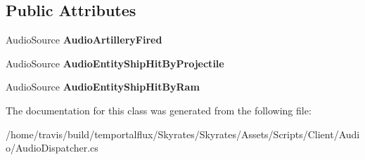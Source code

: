 \subsection*{Public Attributes}
\begin{DoxyCompactItemize}
\item 
\hypertarget{class_skyrates_1_1_client_1_1_audio_dispatcher_ad996cff373d93efc72d30948bf5a30d7}{Audio\-Source {\bfseries Audio\-Artillery\-Fired}}\label{class_skyrates_1_1_client_1_1_audio_dispatcher_ad996cff373d93efc72d30948bf5a30d7}

\item 
\hypertarget{class_skyrates_1_1_client_1_1_audio_dispatcher_a3bcd016090038e5f09c8735ad5cba131}{Audio\-Source {\bfseries Audio\-Entity\-Ship\-Hit\-By\-Projectile}}\label{class_skyrates_1_1_client_1_1_audio_dispatcher_a3bcd016090038e5f09c8735ad5cba131}

\item 
\hypertarget{class_skyrates_1_1_client_1_1_audio_dispatcher_a67abfa1ba1df41fd20457865b10b9a4a}{Audio\-Source {\bfseries Audio\-Entity\-Ship\-Hit\-By\-Ram}}\label{class_skyrates_1_1_client_1_1_audio_dispatcher_a67abfa1ba1df41fd20457865b10b9a4a}

\end{DoxyCompactItemize}


The documentation for this class was generated from the following file\-:\begin{DoxyCompactItemize}
\item 
/home/travis/build/temportalflux/\-Skyrates/\-Skyrates/\-Assets/\-Scripts/\-Client/\-Audio/Audio\-Dispatcher.\-cs\end{DoxyCompactItemize}
